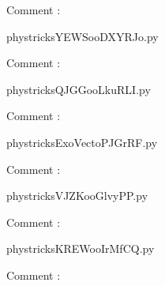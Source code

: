     Comment : 

    \clearpage
    


    \newcommand{\CaptionFigYEWSooDXYRJo}{<+Type your caption here+>}
    \begin{center}
        
    \end{center}
    phystricksYEWSooDXYRJo.py

    Comment : 

    \clearpage
    


    \newcommand{\CaptionFigQJGGooLkuRLI}{<+Type your caption here+>}
    \begin{center}
        
    \end{center}
    phystricksQJGGooLkuRLI.py

    Comment : 

    \clearpage
    


    \newcommand{\CaptionFigExoVectoPJGrRF}{<+Type your caption here+>}
    \begin{center}
        
    \end{center}
    phystricksExoVectoPJGrRF.py

    Comment : 

    \clearpage
    


    \newcommand{\CaptionFigVJZKooGlvyPP}{<+Type your caption here+>}
    \begin{center}
        
    \end{center}
    phystricksVJZKooGlvyPP.py

    Comment : 

    \clearpage
    


    \newcommand{\CaptionFigKREWooIrMfCQ}{<+Type your caption here+>}
    \begin{center}
        
    \end{center}
    phystricksKREWooIrMfCQ.py

    Comment : 

    \clearpage
    

